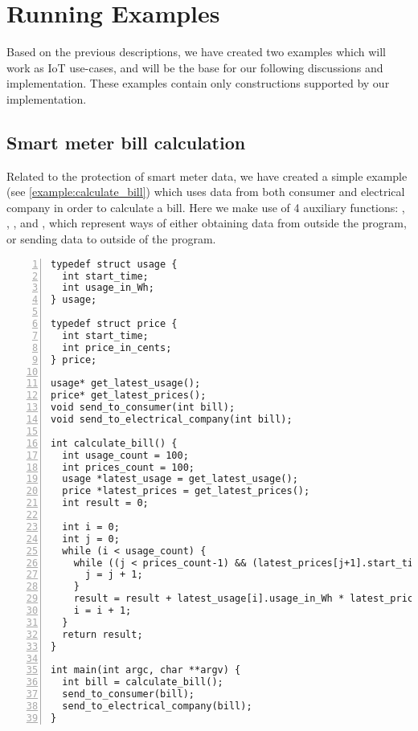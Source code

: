 
\section{Running Examples}
Based on the previous descriptions, we have created two examples which will work as IoT use-cases, and will be the base for our following discussions and implementation.
These examples contain only constructions supported by our implementation.

\subsection{Smart meter bill calculation}
Related to the protection of smart meter data, we have created a simple example (see \cref{example:calculate_bill}) which uses data from both consumer and electrical company in order to calculate a bill.
Here we make use of 4 auxiliary functions: , , , and , which represent ways of either obtaining data from outside the program, or sending data to outside of the program.

\begin{lstlisting}[float, style=dlmc, numbers=left, caption={Smart meter bill calculation}, label=example:calculate_bill]
typedef struct usage {
  int start_time;
  int usage_in_Wh;
} usage;

typedef struct price {
  int start_time;
  int price_in_cents;
} price;

usage* get_latest_usage();
price* get_latest_prices();
void send_to_consumer(int bill);
void send_to_electrical_company(int bill);

int calculate_bill() {
  int usage_count = 100;
  int prices_count = 100;
  usage *latest_usage = get_latest_usage();
  price *latest_prices = get_latest_prices();
  int result = 0;

  int i = 0;
  int j = 0;
  while (i < usage_count) {
    while ((j < prices_count-1) && (latest_prices[j+1].start_time <= latest_usage[i].start_time)) {
      j = j + 1;
    }
    result = result + latest_usage[i].usage_in_Wh * latest_prices[j].price_in_cents;
    i = i + 1;
  }
  return result;
}

int main(int argc, char **argv) {
  int bill = calculate_bill();
  send_to_consumer(bill);
  send_to_electrical_company(bill);
}
\end{lstlisting}

